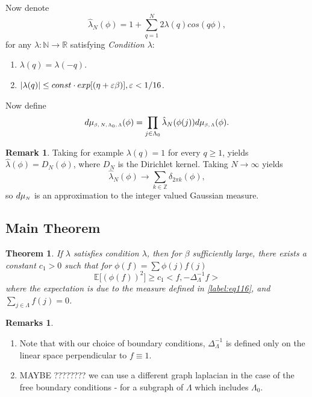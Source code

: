 \documentclass[11pt,reqno]{article}
\DeclarePairedDelimiter\abs{\lvert}{\rvert}%
\newtheorem{thm}{Theorem}[section]
\theoremstyle{definition}
\newtheorem*{remark}{Remark}
\newtheorem*{remarks}{Remarks}
\numberwithin{equation}{section}
\begin{document}
Now denote
\begin{equation} \label{label:lambdahat}
\hat{\lambda}_N(\phi) = 1 + \sum_{q=1}^N 2\lambda(q)cos(q\phi),
\end{equation}
for any $\lambda: \mathbb{N} \rightarrow \mathbb{R}$ satisfying \textit{Condition $\lambda$}:
\begin{enumerate}
\item $\lambda(q) = \lambda(-q)$.
\item $\abs{\lambda(q)} \leq const \cdot exp[(\eta + \varepsilon\beta)], \varepsilon < 1/16$.
\end{enumerate}
Now define
\begin{equation} \label{label:eq116}
d\mu_\text{\tiny$\beta, N, \Lambda_0, \Lambda$}(\phi) = \prod_{j \in \Lambda_0} \hat{\lambda}_N(\phi(j))d\mu_{\text{\tiny$\beta, \Lambda$}}(\phi).
\end{equation}

\begin{remark}
Taking for example $\lambda(q)=1$ for every $q \geq 1$, yields $\hat{\lambda}(\phi) = D_N(\phi)$, where $D_N$ is the Dirichlet kernel. Taking $N \rightarrow \infty$ yields 
$$
\hat{\lambda}_N(\phi) \rightarrow \sum_{k \in \mathbb{Z}} \delta_{2 \pi k} (\phi),
$$
so $d\mu_\text{\tiny$N$}$ is an approximation to the integer valued Gaussian measure.
\end{remark}

\subsection{Main Theorem}
\begin{thm}
If $\lambda$ satisfies condition $\lambda$, then for $\beta$ sufficiently large, there exists a constant $c_1>0$ such that for $\phi(f) = \sum\phi(j)f(j)$
$$
\mathbb{E}\big[ (\phi(f))^2 \big] \geq c_1<f, -\Delta_\Lambda^{-1}f>
$$
where the expectation is due to the measure defined in \eqref{label:eq116}, and  $\sum_{j \in \Lambda} f(j) = 0$.
\end{thm}

\begin{remarks}
\begin{enumerate}
\item Note that with our choice of boundary conditions, $\Delta_\Lambda^{-1}$ is defined only on the linear space perpendicular to $f \equiv 1$.
\item MAYBE ???????? we can use a different graph laplacian in the case of the free boundary conditions - for a subgraph of $\Lambda$ which includes $\Lambda_0$.
\end{enumerate}
\end{remarks}
\end{document}
